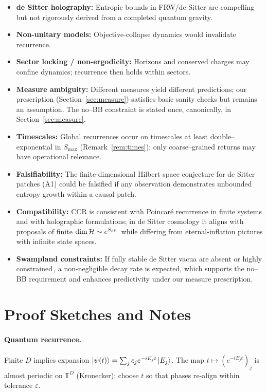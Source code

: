 \documentclass[12pt]{article}
\theoremstyle{remark}
\begin{document}
\begin{itemize}
    \item \textbf{de Sitter holography:} Entropic bounds in FRW/de Sitter are compelling but not rigorously derived from a completed quantum gravity.
    \item \textbf{Non-unitary models:} Objective-collapse dynamics would invalidate recurrence.
    \item \textbf{Sector locking / non-ergodicity:} Horizons and conserved charges may confine dynamics; recurrence then holds within sectors.
    \item \textbf{Measure ambiguity:} Different measures yield different predictions; our prescription (Section~\ref{sec:measure}) satisfies basic sanity checks but remains an assumption. The no--BB constraint is stated once, canonically, in Section~\ref{sec:measure}.
    \item \textbf{Timescales:} Global recurrences occur on timescales at least double--exponential in $S_{\max}$ (Remark~\ref{rem:times}); only coarse--grained returns may have operational relevance.
    \item \textbf{Falsifiability:} The finite-dimensional Hilbert space conjecture for de Sitter patches (A1) could be falsified if any observation demonstrates unbounded entropy growth within a causal patch.
    \item \textbf{Compatibility:} CCR is consistent with Poincar\'e recurrence in finite systems and with holographic formulations; in de Sitter cosmology it aligns with proposals of finite $\dim\mathcal H\sim e^{S_{\rm dS}}$\,\cite{BanksFischler2001,BanksFischler2003} while differing from eternal-inflation pictures with infinite state spaces.
    \item \textbf{Swampland constraints:} If fully stable de Sitter vacua are absent or highly constrained\,\cite{Obied2018,Ooguri2019}, a non-negligible decay rate is expected, which supports the no--BB requirement and enhances predictivity under our measure prescription.
\end{itemize}


\section{Proof Sketches and Notes}
\paragraph{Quantum recurrence.} Finite $D$ implies expansion $|\psi(t)\rangle=\sum_j c_j e^{-iE_j t}\ket{E_j}$. The map $t\mapsto (e^{-iE_j t})_j$ is almost periodic on $\mathbb{T}^D$ (Kronecker); choose $t$ so that phases re-align within tolerance $\varepsilon$.
\end{document}
